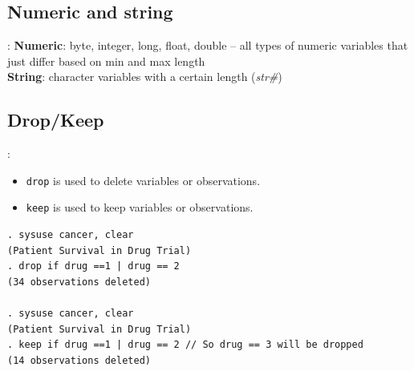 \subsection{Numeric and string}
\begin{frame}[fragile]{\secname : \subsecname}
\textbf{Numeric}: byte, integer, long, float, double -- all types of numeric variables that just differ based on min and max length \\
\textbf{String}: character variables with a certain length (\textit{str\#})
\end{frame}

\subsection{Drop/Keep}
\begin{frame}[fragile]{\secname : \subsecname}
\begin{itemize}
	\item \verb|drop| is used to delete variables or observations.
	\item \verb|keep| is used to keep variables or observations.
\end{itemize}

\small
\begin{verbatim}
. sysuse cancer, clear
(Patient Survival in Drug Trial)
. drop if drug ==1 | drug == 2
(34 observations deleted)

. sysuse cancer, clear
(Patient Survival in Drug Trial)
. keep if drug ==1 | drug == 2 // So drug == 3 will be dropped
(14 observations deleted)
\end{verbatim}
\end{frame}

